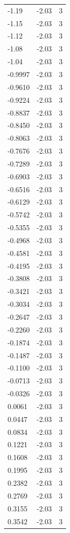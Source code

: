 \begin{longtable}{lrr}
  -1.19 & -2.03 & 3 \\
  -1.15 & -2.03 & 3 \\
  -1.12 & -2.03 & 3 \\
  -1.08 & -2.03 & 3 \\
  -1.04 & -2.03 & 3 \\
  -0.9997 & -2.03 & 3 \\
  -0.9610 & -2.03 & 3 \\
  -0.9224 & -2.03 & 3 \\
  -0.8837 & -2.03 & 3 \\
  -0.8450 & -2.03 & 3 \\
  -0.8063 & -2.03 & 3 \\
  -0.7676 & -2.03 & 3 \\
  -0.7289 & -2.03 & 3 \\
  -0.6903 & -2.03 & 3 \\
  -0.6516 & -2.03 & 3 \\
  -0.6129 & -2.03 & 3 \\
  -0.5742 & -2.03 & 3 \\
  -0.5355 & -2.03 & 3 \\
  -0.4968 & -2.03 & 3 \\
  -0.4581 & -2.03 & 3 \\
  -0.4195 & -2.03 & 3 \\
  -0.3808 & -2.03 & 3 \\
  -0.3421 & -2.03 & 3 \\
  -0.3034 & -2.03 & 3 \\
  -0.2647 & -2.03 & 3 \\
  -0.2260 & -2.03 & 3 \\
  -0.1874 & -2.03 & 3 \\
  -0.1487 & -2.03 & 3 \\
  -0.1100 & -2.03 & 3 \\
  -0.0713 & -2.03 & 3 \\
  -0.0326 & -2.03 & 3 \\
  0.0061 & -2.03 & 3 \\
  0.0447 & -2.03 & 3 \\
  0.0834 & -2.03 & 3 \\
  0.1221 & -2.03 & 3 \\
  0.1608 & -2.03 & 3 \\
  0.1995 & -2.03 & 3 \\
  0.2382 & -2.03 & 3 \\
  0.2769 & -2.03 & 3 \\
  0.3155 & -2.03 & 3 \\
  0.3542 & -2.03 & 3 \\

\end{longtable}
